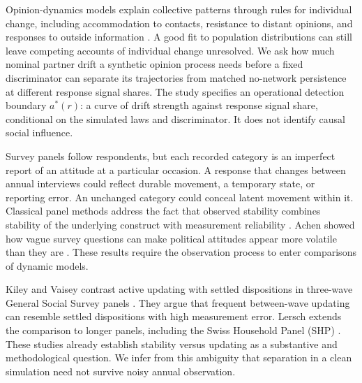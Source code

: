 Opinion-dynamics models explain collective patterns through rules for individual change, including accommodation to contacts, resistance to distant opinions, and responses to outside information \cite{flache2017}. A good fit to population distributions can still leave competing accounts of individual change unresolved.
We ask how much nominal partner drift a synthetic opinion process needs before a fixed discriminator can separate its trajectories from matched no-network persistence at different response signal shares. The study specifies an operational detection boundary $a^*(r)$: a curve of drift strength against response signal share, conditional on the simulated laws and discriminator. It does not identify causal social influence.

Survey panels follow respondents, but each recorded category is an imperfect report of an attitude at a particular occasion. A response that changes between annual interviews could reflect durable movement, a temporary state, or reporting error. An unchanged category could conceal latent movement within it. Classical panel methods address the fact that observed stability combines stability of the underlying construct with measurement reliability \cite{heise1969,wiley1970}. Achen showed how vague survey questions can make political attitudes appear more volatile than they are \cite{achen1975}. These results require the observation process to enter comparisons of dynamic models.

Kiley and Vaisey contrast active updating with settled dispositions in three-wave General Social Survey panels \cite{kiley2020}. They argue that frequent between-wave updating can resemble settled dispositions with high measurement error. Lersch extends the comparison to longer panels, including the Swiss Household Panel (SHP) \cite{lersch2023}. These studies already establish stability versus updating as a substantive and methodological question. We infer from this ambiguity that separation in a clean simulation need not survive noisy annual observation.

